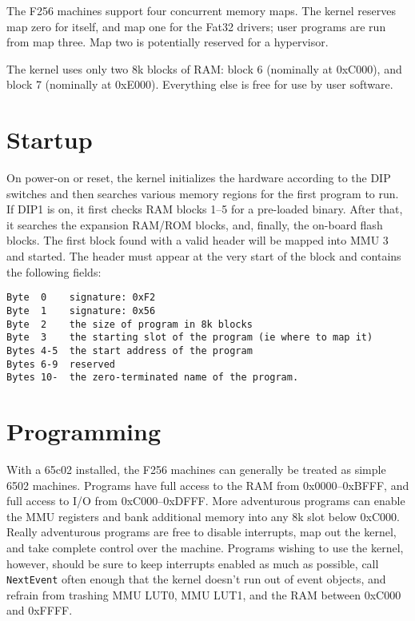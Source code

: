 The F256 machines support four concurrent memory maps.  The kernel reserves map zero for itself, and map one for the Fat32 drivers; user programs are run from map three.  Map two is potentially reserved for a hypervisor. 

The kernel uses only two 8k blocks of RAM: block 6 (nominally at 0xC000), and block 7 (nominally at 0xE000).  Everything else is free for use by user software.

\section*{Startup}

On power-on or reset, the kernel initializes the hardware according to the DIP switches and then searches various memory regions for the first program to run.  If DIP1 is on, it first checks RAM blocks 1--5 for a pre-loaded binary.  After that, it searches the expansion RAM/ROM blocks, and, finally, the on-board flash blocks. The first block found with a valid header will be mapped into MMU 3 and started.  The header must appear at the very start of the block and contains the following fields:

\begin{verbatim}
Byte  0    signature: 0xF2
Byte  1    signature: 0x56
Byte  2    the size of program in 8k blocks
Byte  3    the starting slot of the program (ie where to map it)
Bytes 4-5  the start address of the program
Bytes 6-9  reserved
Bytes 10-  the zero-terminated name of the program.
\end{verbatim}

\section*{Programming}

With a 65c02 installed, the F256 machines can generally be treated as simple 6502 machines.  Programs have full access to the RAM from 0x0000--0xBFFF, and full access to I/O from 0xC000--0xDFFF.  More adventurous programs can enable the MMU registers and bank additional memory into any 8k slot below 0xC000.  Really adventurous programs are free to disable interrupts, map out the kernel, and take complete control over the machine.  Programs wishing to use the kernel, however, should be sure to keep interrupts enabled as much as possible, call \verb+NextEvent+ often enough that the kernel doesn't run out of event objects, and refrain from trashing MMU LUT0, MMU LUT1, and the RAM between 0xC000 and 0xFFFF.

